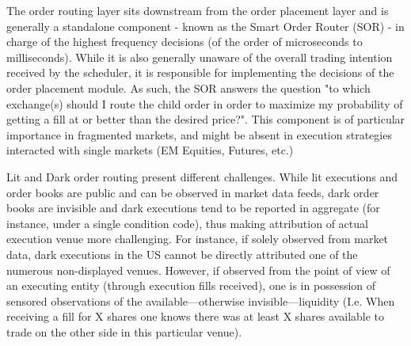 The order routing layer sits downstream from the order placement layer and is generally a standalone component - known as the Smart Order Router (SOR) - in charge of the highest frequency decisions (of the order of microseconds to milliseconds). 
While it is also generally unaware of the overall trading intention received by the scheduler, it is responsible for implementing the decisions of the order placement module. As such, the SOR answers the question "to which exchange(s) should I route the child order in order to maximize my probability of getting a fill at or better than the desired price?". This component is of particular importance in fragmented markets, and might be absent in execution strategies interacted with single markets (EM Equities, Futures, etc.)

Lit and Dark order routing present different challenges. While lit executions and order books are public and can be observed in market data feeds, dark order books are invisible and dark executions tend to be reported in aggregate (for instance, under a single condition code), thus making attribution of actual execution venue more challenging. For instance, if solely observed from market data, dark executions in the US cannot be directly attributed one of the numerous non-displayed venues. However, if observed from the point of view of an executing entity (through execution fills received), one is in possession of sensored observations of the available---otherwise invisible---liquidity (I.e. When receiving a fill for X shares one knows there was at least X shares available to trade on the other side in this particular venue). 

